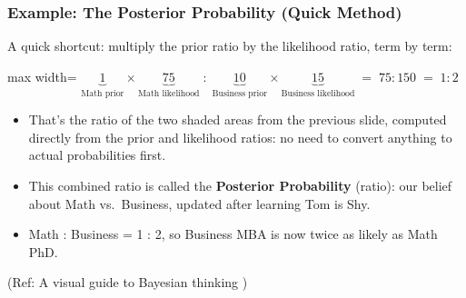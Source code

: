 \begin{frame}[fragile]\frametitle{Example: The Posterior Probability (Quick Method)}
A quick shortcut: multiply the prior ratio by the likelihood ratio, term by term:
\begin{center}
\begin{adjustbox}{max width=\linewidth}
$\underbrace{1}_{\text{Math prior}} \times \underbrace{75}_{\text{Math likelihood}} \; : \; \underbrace{10}_{\text{Business prior}} \times \underbrace{15}_{\text{Business likelihood}} \;=\; 75:150 \;=\; 1:2$
\end{adjustbox}
\end{center}
\begin{itemize}
\item That's the ratio of the two shaded areas from the previous slide, computed directly from the prior and likelihood ratios: no need to convert anything to actual probabilities first.
\item This combined ratio is called the \textbf{Posterior Probability} (ratio): our belief about Math vs.\ Business, updated after learning Tom is Shy.
\item Math : Business = 1 : 2, so Business MBA is now twice as likely as Math PhD.
\end{itemize}

{\tiny (Ref: A visual guide to Bayesian thinking )}
\end{frame}

